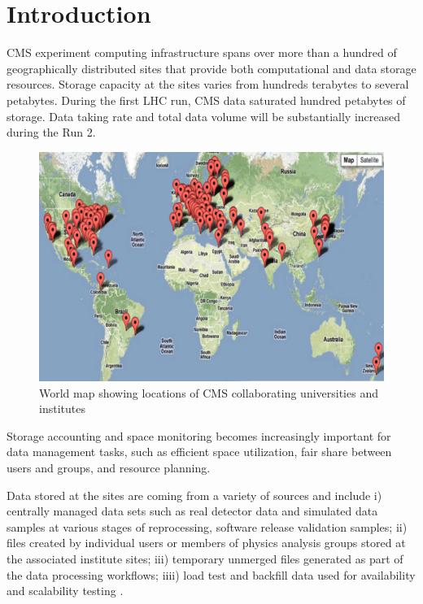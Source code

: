 \section{Introduction}

CMS experiment computing \cite{cmscomptdr} infrastructure spans over more than a hundred 
of geographically distributed sites that provide both computational and data storage 
resources. Storage capacity at the sites varies from hundreds terabytes to several petabytes. 
During the first LHC run, CMS data saturated hundred petabytes of storage. 
Data taking rate and total data volume will be substantially increased during the Run 2.

\begin{figure}[h]
\center
\includegraphics[width=0.95\linewidth]
{pictures/cms-sites-map.pdf}
\caption{World map showing locations of CMS collaborating universities and institutes}
\label{fig:sites_map}
\end{figure}

Storage accounting and space monitoring becomes increasingly important for data 
management tasks, such as efficient space utilization, fair share between users and 
groups, and resource planning.

Data stored at the sites are coming from a variety of sources and include i) centrally managed 
data sets such as real detector data and simulated data samples at various stages of reprocessing, 
software release validation samples; ii) files created by individual 
users or members of physics analysis groups stored at the associated institute sites; 
iii) temporary unmerged files generated as part of the data processing workflows; 
iiii) load test and backfill data used for availability and scalability testing \cite{scalability}.

